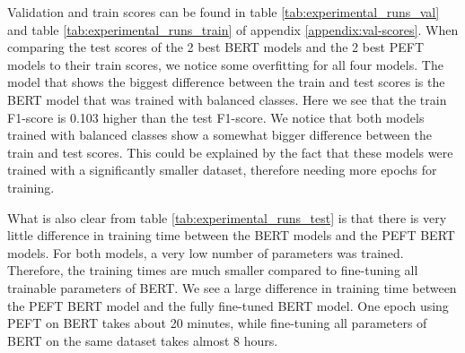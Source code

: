 \documentclass[sigconf, natbib=true]{acmart}
\begin{document}
Validation and train scores can be found in table \ref{tab:experimental_runs_val} and table \ref{tab:experimental_runs_train} of appendix \ref{appendix:val-scores}. 
When comparing the test scores of the 2 best BERT models and the 2 best PEFT models to their train scores, we notice some overfitting for all four models. 
The model that shows the biggest difference between the train and test scores is the BERT model that was trained with balanced classes. 
Here we see that the train F1-score is 0.103 higher than the test F1-score. 
We notice that both models trained with balanced classes show a somewhat bigger difference between the train and test scores. 
This could be explained by the fact that these models were trained with a significantly smaller dataset, therefore needing more epochs for training.

What is also clear from table \ref{tab:experimental_runs_test} is that there is very little difference in training time between the BERT models and the PEFT BERT models. 
For both models, a very low number of parameters was trained. 
Therefore, the training times are much smaller compared to fine-tuning all trainable parameters of BERT. 
We see a large difference in training time between the PEFT BERT model and the fully fine-tuned BERT model. 
One epoch using PEFT on BERT takes about 20 minutes, while fine-tuning all parameters of BERT on the same dataset takes almost 8 hours.
\end{document}
